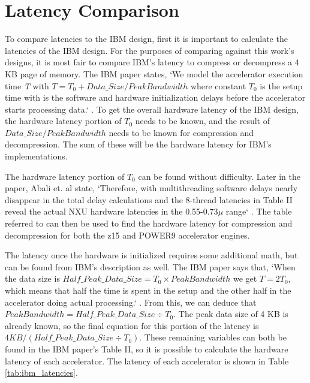 \documentclass[doublespace,nopageskip]{VTthesis}
\begin{document}
\section{Latency Comparison}\label{se:latency_comparison}
To compare latencies to the IBM design, first it is important to calculate the latencies of the IBM design. For the purposes of comparing against this work's designs, it is most fair to compare IBM's latency to compress or decompress a 4 KB page of memory. The IBM paper states, `We model the accelerator execution time \emph{T} with $T=T_{0}+Data\_Size/PeakBandwidth$ where constant \emph{$T_{0}$} is the setup time with is the software and hardware initialization delays before the accelerator starts processing data.` \cite{ibm}. To get the overall hardware latency of the IBM design, the hardware latency portion of \emph{$T_{0}$} needs to be known, and the result of $Data\_Size/PeakBandwidth$ needs to be known for compression and decompression. The sum of these will be the hardware latency for IBM's implementations.

The hardware latency portion of \emph{$T_{0}$} can be found without difficulty. Later in the paper, Abali et. al state, `Therefore, with multithreading software delays nearly disappear in the total delay calculations and the 8-thread latencies in Table II reveal the actual NXU hardware latencies in the 0.55-0.73\emph{$\mu$} range` \cite{ibm}. The table referred to can then be used to find the hardware latency for compression and decompression for both the z15 and POWER9 accelerator engines.

The latency once the hardware is initialized requires some additional math, but can be found from IBM's description as well. The IBM paper says that, `When the data size is $Half\_Peak\_Data\_Size=T_{0} \times PeakBandwidth$ we get $T=2T_{0}$, which means that half the time is spent in the setup and the other half in the accelerator doing actual processing.` \cite{ibm}. From this, we can deduce that $PeakBandwidth=Half\_Peak\_Data\_Size \div T_{0}$. The peak data size of 4 KB is already known, so the final equation for this portion of the latency is $4KB/(Half\_Peak\_Data\_Size \div T_{0})$. These remaining variables can both be found in the IBM paper's Table II, so it is possible to calculate the hardware latency of each accelerator. The latency of each accelerator is shown in Table \ref{tab:ibm_latencies}.
\end{document}
